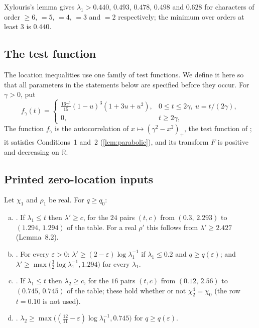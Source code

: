 \documentclass[11pt]{amsart}
\numberwithin{equation}{section}
\theoremstyle{plain}
\theoremstyle{definition}
\theoremstyle{remark}
\newcommand{\RR}{\mathbb{R}}
\newcommand{\eps}{\varepsilon}
\newcommand{\1}{\mathbf{1}}
\begin{document}
Xylouris's lemma gives $\lambda_1>0.440$, $0.493$, $0.478$, $0.498$ and $0.628$ for characters of order
$\ge6$, $=5$, $=4$, $=3$ and $=2$ respectively; the minimum over orders at least $3$ is $0.440$.

\subsection{The test function}
The location inequalities use one family of test functions. We define it here so that
all parameters in the statements below are specified before they occur.
For $\gamma>0$, put
\begin{equation}\label{eq:ftest}
  f_\gamma(t)=\begin{cases}\frac{16\gamma^5}{15}(1-u)^3(1+3u+u^2),&0\le t\le2\gamma,\ u=t/(2\gamma),\\
  0,&t\ge2\gamma,\end{cases}
\end{equation}
The function $f_\gamma$ is the autocorrelation of $x\mapsto(\gamma^2-x^2)_+$, the test function of
\cite[(3.14), (3.17)--(3.18)]{Xylouris2011nullstellen}; it satisfies Conditions~1 and~2
(\cref{lem:parabolic}), and its transform $F$ is positive and decreasing on $\RR$.

\subsection{Printed zero-location inputs}

\begin{inp}\label{inp:rrtables}
Let $\chi_1$ and $\rho_1$ be real. For $q\ge q_0$:
\begin{enumerate}[(a)]
  \item \cite[Tables~3 and~4, Lemmas~8.2 and~8.3]{HeathBrown1992zero}. If $\lambda_1\le t$ then
    $\lambda'\ge c$, for the $24$ pairs $(t,c)$ from $(0.3,\,2.293)$ to $(1.294,\,1.294)$ of the table.
    For a real $\rho'$ this follows from $\lambda'\ge2.427$ (Lemma~8.2).
  \item \cite[Lemma~8.4]{HeathBrown1992zero}. For every $\eps>0$: $\lambda'\ge(2-\eps)\log\lambda_1^{-1}$ if
    $\lambda_1\le0.2$ and $q\ge q(\eps)$; and $\lambda'\ge\max\bigl(\frac32\log\lambda_1^{-1},1.294\bigr)$ for every $\lambda_1$.
  \item \cite[Table~7 and Lemma~8.7]{HeathBrown1992zero}. If $\lambda_1\le t$ then $\lambda_2\ge c$, for
    the $16$ pairs $(t,c)$ from $(0.12,\,2.56)$ to $(0.745,\,0.745)$ of the table; these hold whether or
    not $\chi_2^4=\chi_0$ (the row $t=0.10$ is not used).
  \item \cite[Lemma~8.8]{HeathBrown1992zero}. $\lambda_2\ge\max\bigl((\frac{12}{11}-\eps)\log\lambda_1^{-1},0.745\bigr)$
    for $q\ge q(\eps)$.
\end{enumerate}
\end{inp}
\end{document}
